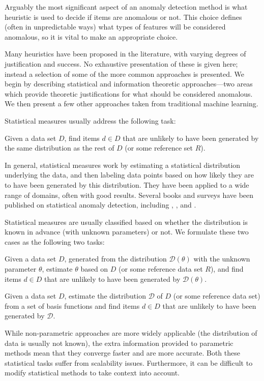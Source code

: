 Arguably the most significant aspect of an anomaly detection method is what heuristic is used to decide if items are anomalous or not. This choice defines (often in unpredictable ways) what types of features will be considered anomalous, so it is vital to make an appropriate choice. 

Many heuristics have been proposed in the literature, with varying degrees of justification and success. No exhaustive presentation of these is given here; instead a selection of some of the more common approaches is presented. We begin by describing statistical and information theoretic approaches---two areas which provide theoretic justifications for what should be considered anomalous. We then present a few other approaches taken from traditional machine learning.

Statistical measures usually address the following task:
\begin{task}
  \label{task:statistical}
  Given a data set $D$, find items $d \in D$ that are unlikely to have been generated by the same distribution as the rest of $D$ (or some reference set $R$).
\end{task}
In general, statistical measures work by estimating a statistical distribution underlying the data, and then labeling data points based on how likely they are to have been generated by this distribution. They have been applied to a wide range of domains, often with good results. Several books and surveys have been published on statistical anomaly detection, including \cite{barnett}, \cite{bakar}, \cite{leroy} and \cite{hawkins}.

Statistical measures are usually classified based on whether the distribution is known in advance (with unknown parameters) or not. We formulate these two cases as the following two tasks:
\begin{task}
  Given a data set $D$, generated from the distribution $\mathcal{D}(\theta)$ with the unknown parameter $\theta$, estimate $\theta$ based on $D$ (or some reference data set $R$), and find items $d \in D$ that are unlikely to have been generated by $\mathcal{D}(\theta)$.
\end{task}
\begin{task}
  Given a data set $D$, estimate the distribution $\mathcal{D}$ of $D$ (or some reference data set) from a set of basis functions and find items $d \in D$ that are unlikely to have been generated by $\mathcal{D}$.
\end{task}
While non-parametric approaches are more widely applicable (the distribution of data is usually not known), the extra information provided to parametric methods mean that they converge faster and are more accurate. Both these statistical tasks suffer from scalability issues. Furthermore, it can be difficult to modify statistical methods to take context into account.

